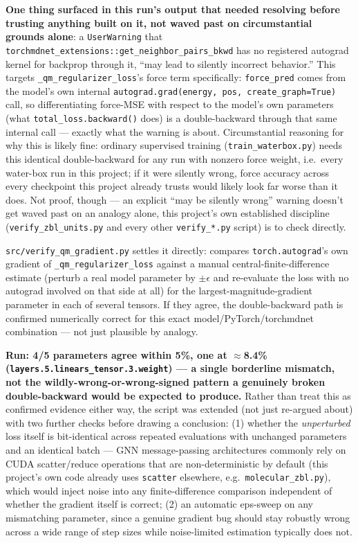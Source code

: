 \documentclass[11pt]{article}
\begin{document}
\textbf{One thing surfaced in this run's output that needed resolving
before trusting anything built on it, not waved past on circumstantial
grounds alone}: a \texttt{UserWarning} that
\texttt{torchmdnet\_extensions::get\_neighbor\_pairs\_bkwd} has no
registered autograd kernel for backprop through it, ``may lead to silently
incorrect behavior.'' This targets \texttt{\_qm\_regularizer\_loss}'s force
term specifically: \texttt{force\_pred} comes from the model's own
internal \texttt{autograd.grad(energy, pos, create\_graph=True)} call, so
differentiating force-MSE with respect to the model's own parameters (what
\texttt{total\_loss.backward()} does) is a double-backward through that
same internal call --- exactly what the warning is about. Circumstantial
reasoning for why this is likely fine: ordinary supervised training
(\texttt{train\_waterbox.py}) needs this identical double-backward for any
run with nonzero force weight, i.e.\ every water-box run in this project;
if it were silently wrong, force accuracy across every checkpoint this
project already trusts would likely look far worse than it does. Not
proof, though --- an explicit ``may be silently wrong'' warning doesn't
get waved past on an analogy alone, this project's own established
discipline (\texttt{verify\_zbl\_units.py} and every other
\texttt{verify\_*.py} script) is to check directly.

\texttt{src/verify\_qm\_gradient.py} settles it directly: compares
\texttt{torch.autograd}'s own gradient of \texttt{\_qm\_regularizer\_loss}
against a manual central-finite-difference estimate (perturb a real model
parameter by $\pm\epsilon$ and re-evaluate the loss with no autograd
involved on that side at all) for the largest-magnitude-gradient parameter
in each of several tensors. If they agree, the double-backward path is
confirmed numerically correct for this exact model/PyTorch/torchmdnet
combination --- not just plausible by analogy.

\textbf{Run: 4/5 parameters agree within 5\%, one at $\approx$8.4\%
(\texttt{layers.5.linears\_tensor.3.weight}) --- a single borderline
mismatch, not the wildly-wrong-or-wrong-signed pattern a genuinely broken
double-backward would be expected to produce.} Rather than treat this as
confirmed evidence either way, the script was extended (not just re-argued
about) with two further checks before drawing a conclusion: (1) whether the
\emph{unperturbed} loss itself is bit-identical across repeated
evaluations with unchanged parameters and an identical batch --- GNN
message-passing architectures commonly rely on CUDA scatter/reduce
operations that are non-deterministic by default (this project's own code
already uses \texttt{scatter} elsewhere, e.g.\ \texttt{molecular\_zbl.py}),
which would inject noise into any finite-difference comparison independent
of whether the gradient itself is correct; (2) an automatic eps-sweep on
any mismatching parameter, since a genuine gradient bug should stay
robustly wrong across a wide range of step sizes while noise-limited
estimation typically does not.
\end{document}
